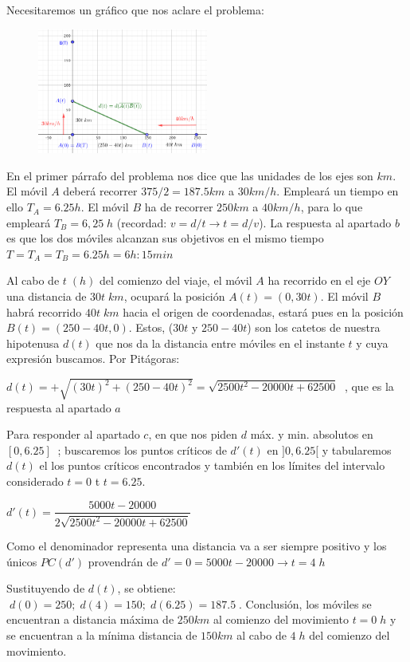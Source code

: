 	\begin{proofw}\renewcommand{\qedsymbol}{$\diamond$}	
	Necesitaremos un gráfico que nos aclare el problema:
	
	\begin{multicols}{2}
		\begin{figure}[H]
			\centering
			\includegraphics[width=0.5\textwidth]{imagenes/imagenes05/T05IM51.png}
		\end{figure}
		En el primer párrafo del problema nos dice que las unidades de los ejes son $km$. El móvil $A$ deberá recorrer $375/2=187.5 km$ a $30km/h$. Empleará un tiempo en ello $T_A=6.25h$. El móvil $B$ ha de recorrer $250 km$ a $40km/h$, para lo que empleará $T_B=6,25\; h$ (recordad: $v=d/t \to t=d/v$). La respuesta al apartado $b$ es que los dos móviles alcanzan sus objetivos en el mismo tiempo $T=T_A=T_B=6.25h=6h:15min$	
	\end{multicols}
	Al cabo de $t \; (h)$ del comienzo del viaje, el móvil $A$ ha recorrido en el eje $OY$ una distancia de $30t\; km$, ocupará la posición $A(t)=(0,30t)$. El móvil $B$ habrá recorrido $40 t \; km$ hacia el origen de coordenadas, estará pues en la posición $B(t)=(250-40t,0)$. Estos, ($30t$ y $250-40t$) son los catetos de nuestra hipotenusa $d(t)$ que nos da la distancia entre móviles en el instante $t$ y cuya expresión buscamos. Por Pitágoras:
	
	$d(t)=+\sqrt{(30t)^2+(250-40t)^2}=\sqrt{2500t^2-20000t+62500}\; $ , que es la respuesta al apartado $a$
	
	Para responder al apartado $c$, en que nos piden $d$ máx. y min. absolutos en $[0,6.25]\ $ ; buscaremos los puntos críticos de $d'(t)$ en $]0,6.25[$ y tabularemos $d(t)$ el los puntos críticos encontrados y también en los límites del intervalo considerado $t=0$ t $t=6.25$.
	
	$d'(t)=\dfrac {5000t-20000}{2\sqrt{2500t^2-20000t+62500}}$
	
	Como el denominador representa una distancia va a ser siempre positivo y los únicos $PC(d')$ provendrán de $d'=0=5000t-20000 \to t=4\; h$
	
	Sustituyendo de $d(t)$, se obtiene: $\; d(0)=250; \; d(4)=150; \; d(6.25)=187.5 \;  $. Conclusión, los móviles se encuentran a distancia máxima de $250km$ al comienzo del movimiento $t=0\; h$ y se encuentran a la mínima distancia de $150km$ al cabo de $4\; h$ del comienzo del movimiento.
	\end{proofw}
	
